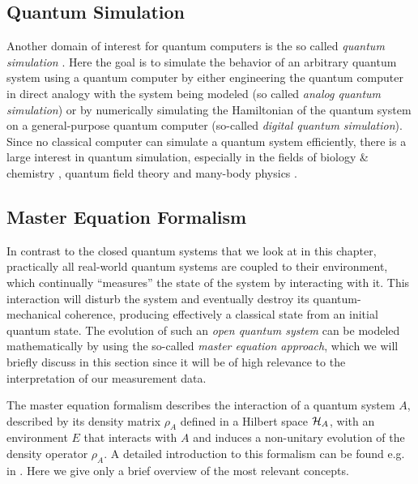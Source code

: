 \subsection{Quantum Simulation}

Another domain of interest for quantum computers is the so called {\it quantum simulation} \citep{lloyd_universal_1996}. Here the goal is to simulate the behavior of an arbitrary quantum system using a quantum computer by either engineering the quantum computer in direct analogy with the system being modeled (so called {\it analog quantum simulation}) or by numerically simulating the Hamiltonian of the quantum system on a general-purpose quantum computer (so-called {\it digital quantum simulation}). Since no classical computer can simulate a quantum system efficiently, there is a large interest in quantum simulation, especially in the fields of biology \& chemistry \citep{barreiro_open-system_2011}, quantum field theory \citep{gerritsma_quantum_2010,freedman_simulation_2002} and many-body physics \citep{simon_quantum_2011}.

\subsection{Master Equation Formalism} \label{section:master_equation}

In contrast to the closed quantum systems that we look at in this chapter, practically all real-world quantum systems are coupled to their environment, which continually ``measures'' the state of the system by interacting with it. This interaction will disturb the system and eventually destroy its quantum-mechanical coherence, producing effectively a classical state from an initial quantum state. The evolution of such an {\it open quantum system} can be modeled mathematically by using the so-called {\it master equation approach}, which we will briefly discuss in this section since it will be of high relevance to the interpretation of our measurement data.

\smallskip

The master equation formalism describes the interaction of a quantum system $A$, described by its density matrix $\rho_A$ defined in a Hilbert space $\begin{mathcal}H\end{mathcal}_A$, with an environment $E$ that interacts with $A$ and induces a non-unitary evolution of the density operator $\rho_A$. A detailed introduction to this formalism can be found e.g. in \citep{haroche_exploring_2006}. Here we give only a brief overview of the most relevant concepts.

